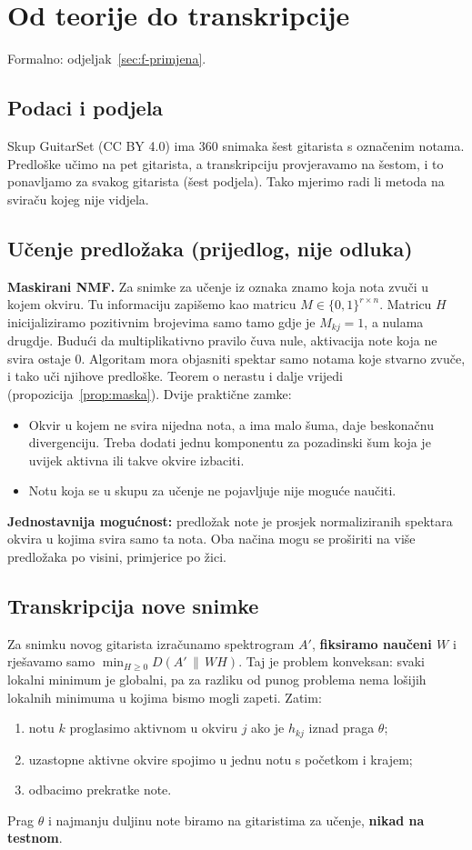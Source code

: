 \documentclass[11pt,a4paper]{article}
\theoremstyle{definition}
\theoremstyle{plain}
\theoremstyle{remark}
\newcommand{\Dkl}[2]{D(#1\,\|\,#2)}
\newcommand{\formalno}[1]{{\small\color{muted}\sffamily Formalno: odjeljak~\ref{#1}.}\par}
\begin{document}
\section{Od teorije do transkripcije}\label{sec:i-primjena}
\formalno{sec:f-primjena}

\subsection{Podaci i podjela}

Skup GuitarSet (CC BY 4.0) ima 360 snimaka šest gitarista s označenim notama. Predloške učimo na
pet gitarista, a transkripciju provjeravamo na šestom, i to ponavljamo za svakog gitarista (šest
podjela). Tako mjerimo radi li metoda na sviraču kojeg nije vidjela.

\subsection{Učenje predložaka (prijedlog, nije odluka)}

\textbf{Maskirani NMF.} Za snimke za učenje iz oznaka znamo koja nota zvuči u kojem okviru. Tu
informaciju zapišemo kao matricu $M\in\{0,1\}^{r\times n}$. Matricu $H$ inicijaliziramo pozitivnim
brojevima samo tamo gdje je $M_{kj}=1$, a nulama drugdje. Budući da multiplikativno pravilo čuva
nule, aktivacija note koja ne svira ostaje $0$. Algoritam mora objasniti spektar samo notama koje
stvarno zvuče, i tako uči njihove predloške. Teorem o nerastu i dalje vrijedi
(propozicija~\ref{prop:maska}). Dvije praktične zamke:
\begin{itemize}
\item Okvir u kojem ne svira nijedna nota, a ima malo šuma, daje beskonačnu divergenciju. Treba
  dodati jednu komponentu za pozadinski šum koja je uvijek aktivna ili takve okvire izbaciti.
\item Notu koja se u skupu za učenje ne pojavljuje nije moguće naučiti.
\end{itemize}
\textbf{Jednostavnija mogućnost:} predložak note je prosjek normaliziranih spektara okvira u kojima
svira samo ta nota. Oba načina mogu se proširiti na više predložaka po visini, primjerice po žici.

\subsection{Transkripcija nove snimke}

Za snimku novog gitarista izračunamo spektrogram $A'$, \textbf{fiksiramo naučeni $W$} i rješavamo
samo $\min_{H\geq0}\Dkl{A'}{WH}$. Taj je problem konveksan: svaki lokalni minimum je globalni, pa
za razliku od punog problema nema lošijih lokalnih minimuma u kojima bismo mogli zapeti. Zatim:
\begin{enumerate}
\item notu $k$ proglasimo aktivnom u okviru $j$ ako je $h_{kj}$ iznad praga $\theta$;
\item uzastopne aktivne okvire spojimo u jednu notu s početkom i krajem;
\item odbacimo prekratke note.
\end{enumerate}
Prag $\theta$ i najmanju duljinu note biramo na gitaristima za učenje, \textbf{nikad na testnom}.
\end{document}
